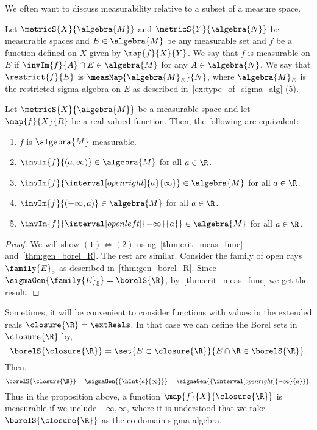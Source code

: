 We often want to discuss measurability relative to a subset of a measure space.
\begin{Definition}[name=Restriction of measurable functions]
    Let $\metricS{X}{\algebra{M}}$ and $\metricS{Y}{\algebra{N}}$ 
    be measurable spaces and $E \in \algebra{M}$ be any measurable set and $f$ be a
    function defined on $X$ given by $\map{f}{X}{Y}$. We say that $f$ is measurable on $E$ if 
    $\invIm{f}{A}\cap E \in \algebra{M}$ for any $A \in \algebra{N}$. We say that $\restrict{f}{E}$ is
    $\measMap{\algebra{M}_{E}}{N}$, where $\algebra{M}_{E}$ is the restricted sigma algebra on $E$ as
    described in~\ref{ex:type_of_sigma_alg} (5).
\end{Definition}

\begin{Proposition}\label{prop:real_val_meas_funct}
    Let $\metricS{X}{\algebra{M}}$ be a measurable space and let $\map{f}{X}{R}$ be a real valued function.
    Then, the following are equivalent:
    \begin{enumerate}
	\item
	    $f$ is $\algebra{M}$ measurable.
	\item
	    $\invIm{f}{(a,\infty)} \in \algebra{M}$ for all $a\in\R$.
	\item
	    $\invIm{f}{\interval[open right]{a}{\infty}} \in \algebra{M}$ for all $a\in\R$.
	\item
	    $\invIm{f}{(-\infty,a)} \in \algebra{M}$ for all $a\in\R$.
	\item
	    $\invIm{f}{\interval[open left]{-\infty}{a}} \in \algebra{M}$ for all $a\in\R$.
    \end{enumerate}
\end{Proposition}
\begin{proof}
    We will show $(1)\iff(2)$ using~\ref{thm:crit_meas_func} and~\ref{thm:gen_borel_R}. The rest are similar.
    Consider the family of open rays $\family{E}_5$ as described in~\ref{thm:gen_borel_R}. Since
    $\sigmaGen{\family{E}_5} = \borelS{\R}$, by~\ref{thm:crit_meas_func} we get the result.
\end{proof}
\begin{Remark}\label{rmk:extended_reals_meas_func}
    Sometimes, it will be convenient to consider functions with values in the extended reals 
    $\closure{\R} = \extReals$. In that case we can define the Borel sets in $\closure{\R}$ by,
    \[\borelS{\closure{\R}} = \set{E\subset\closure{\R}}{E\cap\R \in \borelS{\R}}.\] Then,
    \[\borelS{\closure{\R}} = \sigmaGen{\lbrace\hInt{a}{\infty}\rbrace} = 
	\sigmaGen{\lbrace \interval[open right]{-\infty}{a}\rbrace}.\]
    Thus in the proposition above, a function $\map{f}{X}{\closure{\R}}$ is measurable if we include
    $-\infty,\infty$, where it is understood that we take $\borelS{\closure{\R}}$ as the co-domain sigma algebra.
\end{Remark}
